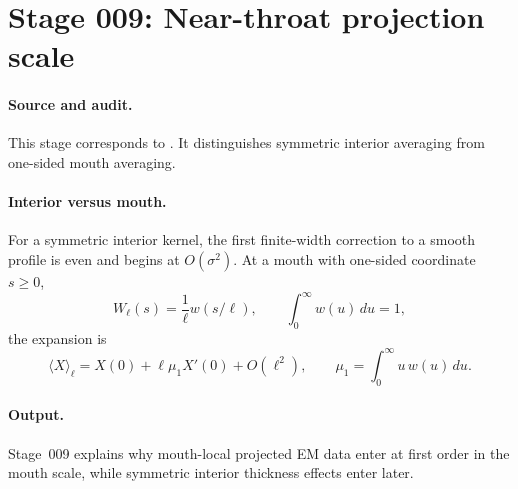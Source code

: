 \section[Stage 009]{Stage 009: Near-throat projection scale}
\label{stage:009}


\paragraph{Source and audit.}
This stage corresponds to
.
It distinguishes symmetric interior averaging from one-sided mouth averaging.

\paragraph{Interior versus mouth.}
For a symmetric interior kernel, the first finite-width correction to a smooth
profile is even and begins at \(O(\sigma^2)\).  At a mouth with one-sided
coordinate \(s\ge0\),
\begin{equation}
\label{eq:stage009-mouth-kernel}
W_\ell(s)=\frac1\ell w(s/\ell),
\qquad
\int_0^\infty w(u)\,du=1,
\end{equation}
the expansion is
\begin{equation}
\label{eq:stage009-mouth-expansion}
\langle X\rangle_\ell
=X(0)+\ell\mu_1X'(0)+O(\ell^2),
\qquad
\mu_1=\int_0^\infty u\,w(u)\,du .
\end{equation}

\paragraph{Output.}
Stage~009 explains why mouth-local projected EM data enter at first order
in the mouth scale, while symmetric interior thickness effects enter later.
